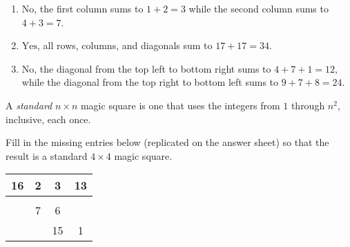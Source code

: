 \documentclass[11pt]{article}
\renewenvironment{problem}{\begin{problems}}{\end{problems}\vspace{5pt}}
\begin{document}
\begin{solution}
\begin{enumerate}[label=(\alph*)]
\item $\boxed{\text{No}}$, the first column sums to $1+2 = 3$ while the second column sums to $4+3 = 7$.

\item $\boxed{\text{Yes}}$, all rows, columns, and diagonals sum to $17+17=34$.

\item $\boxed{\text{No}}$, the diagonal from the top left to bottom right sums to $4+7+1=12$, while the diagonal from the
top right to bottom left sums to $9+7+8=24$.
\end{enumerate}
\end{solution}


\begin{definition}
A \textit{standard} $n \times n$ magic square is one that uses the integers from $1$ through $n^2$, inclusive, each once.
\end{definition}

\begin{problem}[4 points]
Fill in the missing entries below (replicated on the answer sheet) so that the result is a standard $4 \times 4$ magic square.

\begin{center}
\begin{tabular}{|c|c|c|c|}
\hline
16 & 2 & 3 & 13 \\ \hline
\phantom{5} & \phantom{11} & \phantom{10} & \phantom{8} \\ \hline
\phantom{9} & 7 & 6 & \phantom{12} \\ \hline
\phantom{4} & \phantom{14} & 15 & 1 \\ \hline
\end{tabular}
\end{center}
\end{problem}
\end{document}
